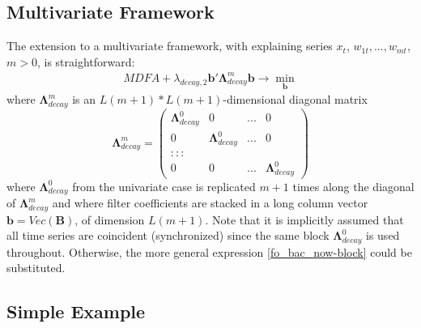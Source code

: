 \documentclass[a4paper]{book}
\begin{document}
\subsection{Multivariate Framework}

The extension to a multivariate framework, with explaining series $x_t$, $w_{1t},...,w_{mt}$, $m>0$, is straightforward: 
\begin{eqnarray*}
MDFA+\lambda_{decay,2}\mathbf{b}'\boldsymbol{\Lambda}_{decay}^m\mathbf{b}\to \min_{\mathbf{b}}
\end{eqnarray*}
where $\boldsymbol{\Lambda}_{decay}^m$ is an $L(m+1)*L(m+1)$-dimensional diagonal matrix 
\[\boldsymbol{\Lambda}_{decay}^m=\left(\begin{array}{cccc}\boldsymbol{\Lambda}_{decay}^0&0&...&0\\
0&\boldsymbol{\Lambda}_{decay}^0&...&0\\
:::\\
0&0&...&\boldsymbol{\Lambda}_{decay}^0\end{array}\right)
\]
where $\boldsymbol{\Lambda}_{decay}^0$ from the univariate case is replicated $m+1$ times along the diagonal of $\boldsymbol{\Lambda}_{decay}^m$ and where filter coefficients are stacked in a long column vector $\mathbf{b}=Vec(\mathbf{B})$, of dimension $L(m+1)$. Note that it is implicitly assumed that all time series are coincident (synchronized) since the same block $\boldsymbol{\Lambda}_{decay}^0$ is used throughout. Otherwise, the more general expression \ref{fo_bac_now-block} could be substituted. 




\subsection{Simple Example}
\end{document}
